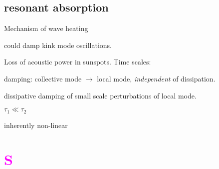 \documentclass[12pt]{article}
\begin{document}
\subsection*{resonant absorption}
\begin{itemize*}
    \item Mechanism of wave heating
    \item could damp kink mode oscillations.
    \item Loss of acoustic power in sunspots. Time scales:
        \begin{enumerate*}
            \item damping: collective mode $\rightarrow$ local mode,
                \emph{independent} of dissipation.
            \item dissipative damping of small scale perturbations of local
                mode.
        \end{enumerate*}
        $\tau_1 \ll \tau_2$
    \item inherently non-linear
\end{itemize*}

\section*{\textcolor{magenta}{S}}
\end{document}
